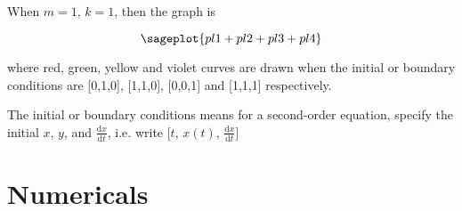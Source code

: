 \documentclass{report}
\begin{document}
When $m=1$, $k=1$, then the graph is

$$\sageplot{pl1+pl2+pl3+pl4}$$

where red, green, yellow and violet curves are drawn when the initial or boundary conditions are [0,1,0], [1,1,0], [0,0,1] and [1,1,1] respectively.

The initial or boundary conditions means for a second-order equation, specify the initial $x$, $y$, and $\frac{\mathrm{d}x}{\mathrm{d}t}$, i.e. write [$t$, $x(t)$, $\frac{\mathrm{d}x}{\mathrm{d}t}$]

\section{Numericals}
\end{document}
